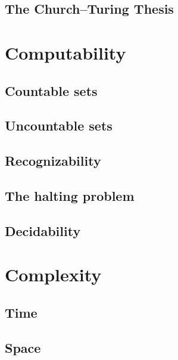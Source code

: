 \documentclass{book}
\begin{document}
\chapter{The Church--Turing Thesis}



\part{Computability}


\chapter{Countable sets}



\chapter{Uncountable sets}



\chapter{Recognizability}



\chapter{The halting problem}



\chapter{Decidability}



\part{Complexity}


\chapter{Time}



\chapter{Space}


\end{document}

